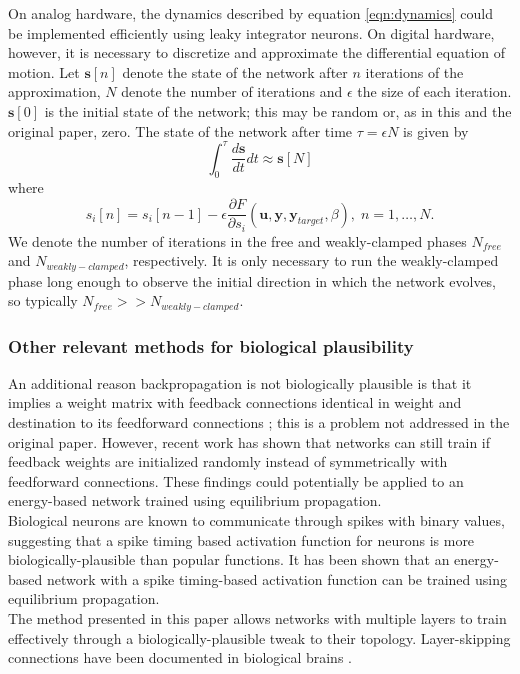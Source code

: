 \documentclass{article}
\newcommand{\mtx}[1]{\bm{#1}}
\newcommand{\npar}{\\\indent}
\begin{document}
On analog hardware, the dynamics described by equation \ref{eqn:dynamics} could be implemented efficiently using leaky integrator neurons. On digital hardware, however, it is necessary to discretize and approximate the differential equation of motion. Let $\mtx{s}[n]$ denote the state of the network after $n$ iterations of the approximation, $N$ denote the number of iterations and $\epsilon$ the size of each iteration. $\mtx{s}[0]$ is the initial state of the network; this may be random or, as in this and the original paper, zero. The state of the network after time $\tau=\epsilon N$ is given by
\begin{equation}
\int_0^\tau\frac{d\mtx{s}}{dt}dt\approx \mtx{s}[N]
\end{equation}
 where
 \begin{equation}
 s_i[n]=s_i[n-1]-\epsilon \frac{\partial F}{\partial s_i}(\mtx{u},\mtx{y},\mtx{y}_{target},\beta),\;n=1,\hdots,N.
 \end{equation}
 We denote the number of iterations in the free and weakly-clamped phases $N_{free}$ and $N_{weakly-clamped}$, respectively. It is only necessary to run the weakly-clamped phase long enough to observe the initial direction in which the network evolves, so typically $N_{free}>>N_{weakly-clamped}$.
 
\subsubsection{Other relevant methods for biological plausibility}

An additional reason backpropagation is not biologically plausible is that it implies a weight matrix with feedback connections identical in weight and destination to its feedforward connections \cite{bengio2015}; this is a problem not addressed in the original paper. However, recent work \cite{lillicrap2014} has shown that networks can still train if feedback weights are initialized randomly instead of symmetrically with feedforward connections. These findings could potentially be applied to an energy-based network trained using equilibrium propagation.
\npar
Biological neurons are known to communicate through spikes with binary values, suggesting that a spike timing based activation function for neurons is more biologically-plausible than popular functions. It has been shown \cite{oconnor2018} that an energy-based network with a spike timing-based activation function can be trained using equilibrium propagation.
\npar
The method presented in this paper allows networks with multiple layers to train effectively through a biologically-plausible tweak to their topology. Layer-skipping connections have been documented in biological brains \cite{bullmore2009}.
\end{document}
